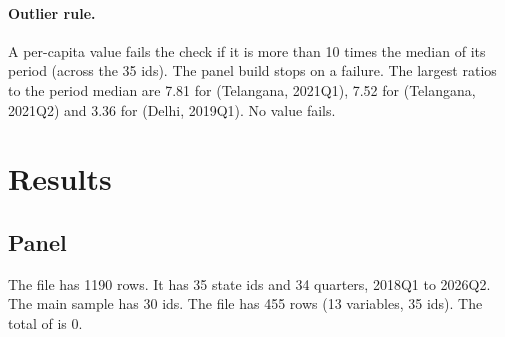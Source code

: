 \documentclass[11pt,a4paper]{article}
\begin{document}
\paragraph{Outlier rule.}
A per-capita value fails the check if it is more than 10 times the median of its period (across the 35 ids). The panel build stops on a failure.
The largest ratios to the period median are 7.81 for  (Telangana, 2021Q1), 7.52 for  (Telangana, 2021Q2) and 3.36 for  (Delhi, 2019Q1). No value fails.

\section{Results}
\subsection{Panel}
The file  has 1190 rows. It has 35 state ids and 34 quarters, 2018Q1 to 2026Q2. The main sample has 30 ids.
The file  has 455 rows (13 variables, 35 ids). The total of  is 0.
\end{document}

